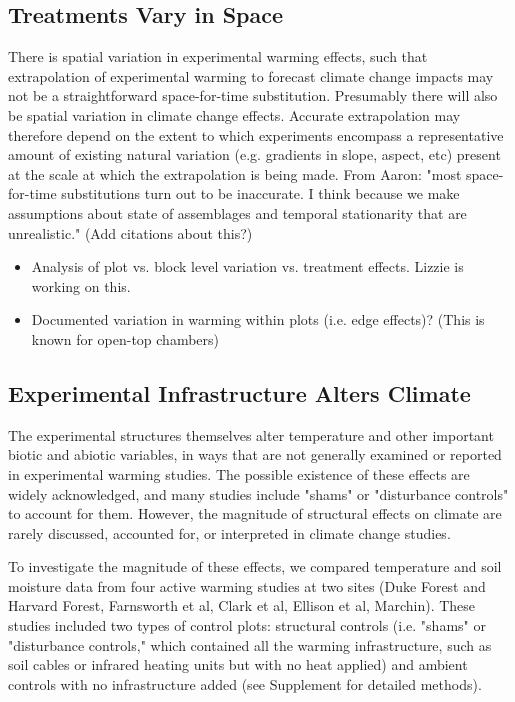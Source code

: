 \documentclass{article}
\begin{document}
\subsection {Treatments Vary in Space}
There is spatial variation in experimental warming effects, such that extrapolation of experimental warming to forecast climate change impacts may not be a straightforward space-for-time substitution. Presumably there will also be spatial variation in climate change effects.  Accurate extrapolation may therefore depend on the extent to which experiments encompass a representative amount of existing natural variation (e.g. gradients in slope, aspect, etc) present at the scale at which the extrapolation is being made. From Aaron: "most space-for-time substitutions turn out to be inaccurate. I think because we make assumptions about state of assemblages and temporal stationarity that are unrealistic." (Add citations about this?)
\begin{itemize}
\item Analysis of plot vs. block level variation vs. treatment effects. Lizzie is working on this.
\item Documented variation in warming within plots (i.e. edge effects)? (This is known for open-top chambers)
\end{itemize}

\subsection {Experimental Infrastructure Alters Climate}
The experimental structures themselves alter temperature and other important biotic and abiotic variables, in ways that are not generally examined or reported in experimental warming studies. The possible existence of these effects are widely acknowledged, and many studies include "shams" or "disturbance controls" to account for them. However, the magnitude of structural effects on climate are rarely discussed, accounted for, or interpreted in climate change studies.
\par To investigate the magnitude of these effects, we compared temperature and soil moisture data from four active warming studies at two sites (Duke Forest and Harvard Forest, Farnsworth et al, Clark et al, Ellison et al, Marchin). These studies included two types of control plots: structural controls (i.e. "shams" or "disturbance controls," which contained all the warming infrastructure, such as soil cables or infrared heating units but with no heat applied) and ambient controls with no infrastructure added (see Supplement for detailed methods).  
\end{document}
